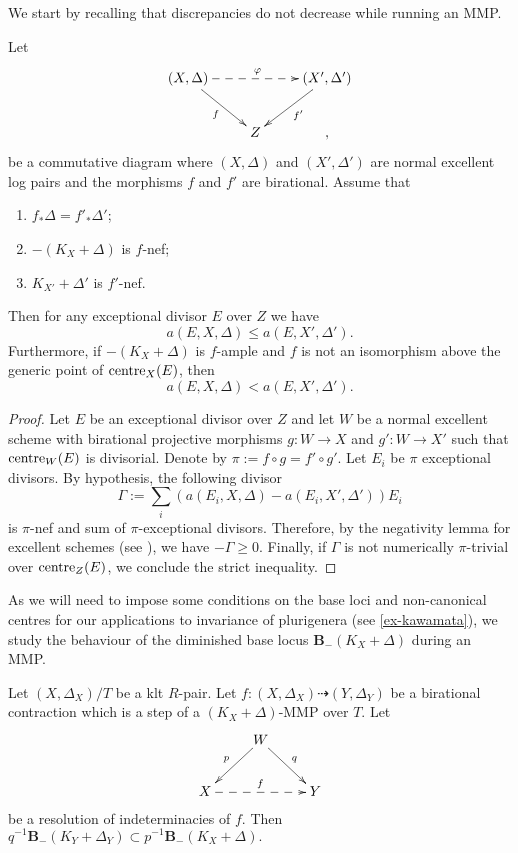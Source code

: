 \documentclass[a4paper,12pt]{book}
\newcommand{\cent}{\textup{centre}}
\begin{document}
	We start by recalling that discrepancies do not decrease while running an MMP.
		\begin{lemma}\label{l:increase-discr}
		Let 
		\[
		\xymatrix{
			(X,\Delta) \ar[dr]_{f}   \ar@{-->}[rr]^{\varphi} &  &  (X', \Delta') \ar[dl]^{f'}  \\
			&Z & ,
		}
		\]
		be a commutative diagram  where $(X,\Delta)$ and $(X', \Delta')$ are normal excellent log pairs and the morphisms $f$ and $f'$ are birational.
		Assume that
		\begin{enumerate}
			\item $f_*\Delta=f'_*\Delta'$;
			\item $-(K_X+\Delta)$ is $f$-nef;
			\item $K_{X'}+\Delta'$ is $f'$-nef. 
		\end{enumerate}
		Then for any exceptional divisor $E$ over $Z$ we have $$a(E, X, \Delta ) \leq a(E, X', \Delta').$$
		Furthermore, if $-(K_X+\Delta)$ is $f$-ample and $f$ is not an isomorphism above the generic point of $\cent_X(E)$, then
		$$ a(E, X, \Delta ) < a(E, X', \Delta').$$
	\end{lemma}
	\begin{proof}
		Let $E$ be an exceptional divisor over $Z$ and let $W$ be a normal excellent scheme with birational projective morphisms $g \colon W \to X$ and $g' \colon W \to X'$ such that $\textup{centre}_W(E)$ is divisorial. Denote by $\pi:= f \circ g=f' \circ g'$. Let $E_{i}$ be $\pi$ exceptional divisors. By hypothesis, the following divisor
		$$\Gamma:= \sum_i \left( a(E_i, X, \Delta)-a(E_i, X', \Delta') \right)E_i $$ 
		is $\pi$-nef and sum of $\pi$-exceptional divisors.
		Therefore, by the negativity lemma for excellent schemes (see \cite[Lemma 2.14]{bhatt2020}), we have $-\Gamma\geq 0$. Finally, if $\Gamma$ is not numerically $\pi$-trivial over $\cent_Z(E)$, we conclude the strict inequality.
	\end{proof}
	
	As we will need to impose some conditions on the base loci and non-canonical centres for our applications to invariance of plurigenera (see \autoref{ex-kawamata}), we study the behaviour of the diminished base locus $\mathbf{B}_{-}(K_X+\Delta)$ during an MMP.
	
	
	\begin{lemma}\label{l-stable-base-loci}
		Let $(X,\Delta_X)/T$ be a klt $R$-pair.
		Let $f\colon (X, \Delta_X) \dashrightarrow (Y, \Delta_Y)$ be a birational contraction which is a step of a  $(K_X+\Delta)$-MMP over $T$.
		Let
		\begin{equation*}
			\xymatrix{
				& W \ar[dr]^q \ar[dl]_p & \\
				X \ar@{-->}[rr]^{f} & & Y}
		\end{equation*} 
		be a resolution of indeterminacies of $f$.
		Then $q^{-1}\mathbf{B}_{-}(K_Y+\Delta_Y) \subset p^{-1}\mathbf{B}_{-}(K_X+\Delta).$
	\end{lemma}
	
\end{document}
